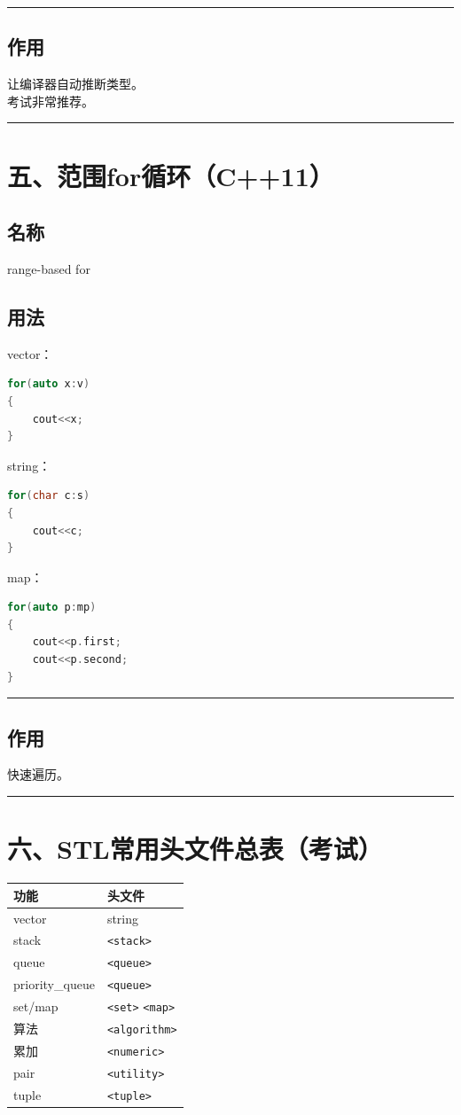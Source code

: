 \documentclass[9pt,twocolumn]{extarticle}
\begin{document}
\noindent\rule{\linewidth}{0.4pt}

\subsection{作用}
让编译器自动推断类型。\\
考试非常推荐。

\noindent\rule{\linewidth}{0.4pt}

\section{五、范围for循环（C++11）}

\subsection{名称}
range-based for

\subsection{用法}
vector：
\begin{lstlisting}[language=C++]
for(auto x:v)
{
    cout<<x;
}
\end{lstlisting}
string：
\begin{lstlisting}[language=C++]
for(char c:s)
{
    cout<<c;
}
\end{lstlisting}
map：
\begin{lstlisting}[language=C++]
for(auto p:mp)
{
    cout<<p.first;
    cout<<p.second;
}
\end{lstlisting}

\noindent\rule{\linewidth}{0.4pt}

\subsection{作用}
快速遍历。

\noindent\rule{\linewidth}{0.4pt}

\section{六、STL常用头文件总表（考试）}

\begin{table}[h]
\centering
\begin{tabular}{|l|l|}
\hline
功能 & 头文件 \\ \hline
vector & string \\ \hline
stack & \texttt{<stack>} \\ \hline
queue & \texttt{<queue>} \\ \hline
priority\_queue & \texttt{<queue>} \\ \hline
set/map & \texttt{<set>} \texttt{<map>} \\ \hline
算法 & \texttt{<algorithm>} \\ \hline
累加 & \texttt{<numeric>} \\ \hline
pair & \texttt{<utility>} \\ \hline
tuple & \texttt{<tuple>} \\ \hline
\end{tabular}
\end{table}
\end{document}
